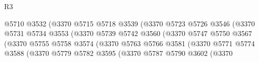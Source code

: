 \begin{lexlean}{R3}
\begin{coremodule}
                                            @5710
                                            @3532
                                            (@3370
                                              @5715
                                              @5718
                                              @3539
                                              (@3370
                                                @5723
                                                @5726
                                                @3546
                                                (@3370
                                                  @5731
                                                  @5734
                                                  @3553
                                                  (@3370
                                                    @5739
                                                    @5742
                                                    @3560
                                                    (@3370
                                                      @5747
                                                      @5750
                                                      @3567
                                                      (@3370
                                                        @5755
                                                        @5758
                                                        @3574
                                                        (@3370
                                                          @5763
                                                          @5766
                                                          @3581
                                                          (@3370
                                                            @5771
                                                            @5774
                                                            @3588
                                                            (@3370
                                                              @5779
                                                              @5782
                                                              @3595
                                                              (@3370
                                                                @5787
                                                                @5790
                                                                @3602
                                                                (@3370

\end{coremodule}
\end{lexlean}
